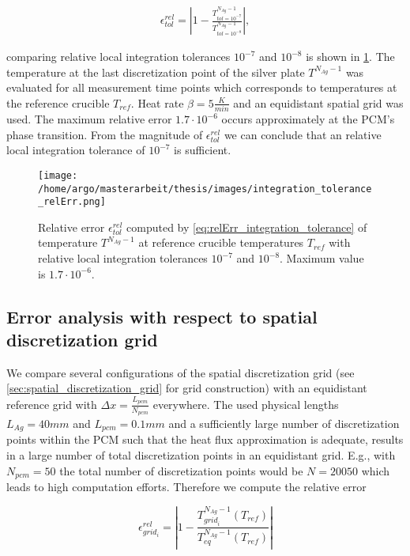 \documentclass{scrartcl}[12pt, halfparskip]
\numberwithin{equation}{section}
\numberwithin{figure}{section}
\numberwithin{table}{section}
\begin{document}
\begin{align}
	\epsilon_{tol}^{rel} = \left|1 - \frac{T^{N_{Ag}-1}_{tol=10^{-7}}}{T^{N_{Ag}-1}_{tol=10^{-8}}} \right|,
	\label{eq:relErr_integration_tolerance}
\end{align}

comparing relative local integration tolerances $10^{-7}$ and $10^{-8}$ is shown in \cref{fig:integration_tolerance_error}.
The temperature at the last discretization point of the silver plate $T^{N_{Ag}-1}$ was evaluated for all measurement time points which corresponds to temperatures at the reference crucible $T_{ref}$. Heat rate $\beta = 5 \frac{K}{min}$ and an equidistant spatial grid was used.
The maximum relative error $1.7 \cdot 10^{-6}$ occurs approximately at the PCM's phase transition. 
From the magnitude of $\epsilon_{tol}^{rel}$ we can conclude that an relative local integration tolerance of $10^{-7}$ is sufficient. \\


\begin{figure}[H]
	\centering
	\texttt{[image: /home/argo/masterarbeit/thesis/images/integration\_tolerance\_relErr.png]}
	\caption{Relative error $\epsilon_{tol}^{rel}$ computed by \cref{eq:relErr_integration_tolerance} of temperature $T^{N_{Ag}-1}$ at reference crucible temperatures $T_{ref}$ with relative local integration tolerances $10^{-7}$ and $10^{-8}$. Maximum value is $1.7 \cdot 10^{-6}$.}
	\label{fig:integration_tolerance_error}
\end{figure}


\subsection{Error analysis with respect to spatial discretization grid}
We compare several configurations of the spatial discretization grid (see \cref{sec:spatial_discretization_grid} for grid construction) with an equidistant reference grid with $\Delta x = \frac{L_{pcm}}{N_{pcm}}$ everywhere. The used physical lengths $L_{Ag}=40mm$ and $L_{pcm}=0.1mm$ and a sufficiently large number of discretization points within the PCM such that the heat flux approximation is adequate, results in a large number of total discretization points in an equidistant grid. E.g., with $N_{pcm}=50$ the total number of discretization points would be $N=20050$ which leads to high computation efforts. Therefore we compute the relative error

\begin{equation}
	\epsilon_{grid_i}^{rel} = \left| 1 - \frac{T_{{grid}_i}^{N_{Ag}-1}(T_{ref})}{T_{eq}^{N_{Ag}-1}(T_{ref})} \right|
	\label{eq:relErr_grid}
\end{equation}
\end{document}
